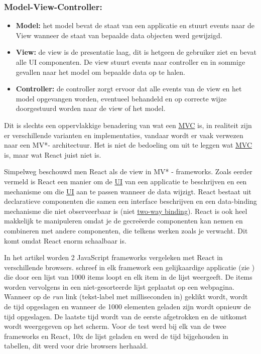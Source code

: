 	\subsubsection*{Model-View-Controller:}
	\begin{itemize}
		\item \textbf{Model:} het model bevat de staat van een applicatie en stuurt events naar de View wanneer de staat van bepaalde data objecten werd gewijzigd.
		\item \textbf{View:} de view is de presentatie laag, dit is hetgeen de gebruiker ziet en bevat alle UI componenten. De view stuurt events naar controller en in sommige gevallen naar het model om bepaalde data op te halen.
		\item \textbf{Controller:} de controller zorgt ervoor dat alle events van de view en het model opgevangen worden, eventueel behandeld en op correcte wijze doorgestuurd worden naar de view of het model.
	\end{itemize}
	
	Dit is slechts een oppervlakkige benadering van wat een \hyperref[mvc]{MVC} is, in realiteit zijn er verschillende varianten en implementaties, vandaar wordt er vaak verwezen naar een MV*- architectuur. Het is niet de bedoeling om uit te leggen wat \hyperref[mvc]{MVC} is, maar wat React juist niet is.
	
	Simpelweg beschouwd men React als de view in MV* - frameworks. Zoals eerder vermeld is React een manier om de \hyperref[ui]{UI} van een applicatie te beschrijven en een mechanisme om die \hyperref[ui]{UI} aan te passen wanneer de data wijzigt. React bestaat uit declaratieve componenten die samen een interface beschrijven en een data-binding mechanisme die niet observeerbaar is (niet \hyperref[twdb]{two-way binding}). React is ook heel makkelijk te manipuleren omdat je de gecreëerde componenten kan nemen en combineren met andere componenten, die telkens werken zoals je verwacht. Dit komt omdat React enorm schaalbaar is.
	
	In het artikel \cite{Harrington:React} worden 2 JavaScript frameworks vergeleken met React in verschillende browsers. \citeauthor{Harrington:React} schreef in elk framework een gelijkaardige applicatie (zie ) die door een lijst van 1000 items loopt en elk item in de lijst weergeeft. De items worden vervolgens in een niet-gesorteerde lijst geplaatst op een webpagina. Wanneer op de \emph{run} link (tekst-label met milliseconden in) geklikt wordt, wordt de tijd opgeslagen en wanneer de 1000 elementen geladen zijn wordt opnieuw de tijd opgeslagen. De laatste tijd wordt van de eerste afgetrokken en de uitkomst wordt weergegeven op het scherm. Voor de test werd bij elk van de twee frameworks en React, 10x de lijst geladen en werd de tijd bijgehouden in tabellen, dit werd voor drie browsers herhaald.
	
